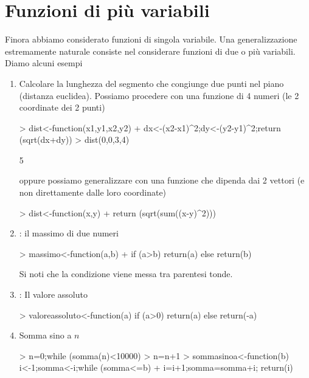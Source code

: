 \documentclass[onecolumn,11pt]{book}
\begin{document}
\section{Funzioni di pi\`u variabili}
Finora abbiamo considerato funzioni di singola variabile. Una generalizzazione estremamente naturale consiste nel considerare funzioni di due o pi\`u variabili. Diamo alcuni esempi
\begin{enumerate}
\item{}
Calcolare la lunghezza del segmento che congiunge  due punti nel piano (distanza euclidea). Possiamo procedere con  una funzione di 4 numeri (le 2 coordinate dei 2 punti)
\begin{Schunk}
\begin{Sinput}
> dist<-function(x1,y1,x2,y2) 
+ {dx<-(x2-x1)^2;dy<-(y2-y1)^2;return (sqrt(dx+dy))}
> dist(0,0,3,4)
\end{Sinput}
\begin{Soutput}
[1] 5
\end{Soutput}
\end{Schunk}
oppure possiamo generalizzare con una funzione che dipenda dai 2 vettori (e non direttamente dalle loro coordinate)
\begin{Schunk}
\begin{Sinput}
> dist<-function(x,y) 
+ {return (sqrt(sum((x-y)^2)))}
\end{Sinput}
\end{Schunk}
\item{}: il massimo di due numeri 
\begin{Schunk}
\begin{Sinput}
> massimo<-function(a,b)
+ if (a>b) return(a) else return(b)
\end{Sinput}
\end{Schunk}
Si noti che la condizione viene messa tra parentesi tonde.
\item{}: Il valore assoluto
\begin{Schunk}
\begin{Sinput}
> valoreassoluto<-function(a) if (a>0) return(a)  else return(-a)
\end{Sinput}
\end{Schunk}


\item{} Somma sino a $n$

\begin{Schunk}
\begin{Sinput}
> n=0;while (somma(n)<10000) 
> n=n+1
> sommasinoa<-function(b) {i<-1;somma<-i;while (somma<=b) 
+ {i=i+1;somma=somma+i}; return(i)}
\end{Sinput}
\end{Schunk}
\end{enumerate}
\end{document}
